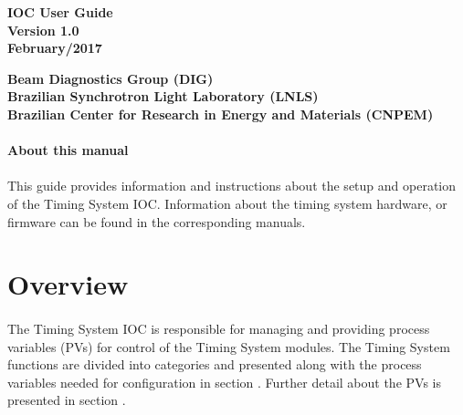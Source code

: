 \documentclass[openany]{article}
\begin{document}
\begin{titlepage}

\thispagestyle{fancy}

\begin{center}

\vspace*{\fill}
\textbf{\Huge IOC User Guide}\\[20pt]
\textbf{\Huge Version 1.0}\\[20pt]
\textbf{\Huge February/2017}
\vspace*{\fill}

\vfill
\textbf{Beam Diagnostics Group (DIG)}\\[5pt]
\textbf{Brazilian Synchrotron Light Laboratory (LNLS)}\\[5pt]
\textbf{Brazilian Center for Research in Energy and Materials (CNPEM)}
\end{center}

\end{titlepage}

\newpage
\pagestyle{plain} %

\paragraph{}{\Large\bfseries About this manual}

\paragraph{} This guide provides information and instructions about the setup and operation of the Timing System IOC. Information about the timing system hardware, or firmware can be found in the corresponding manuals.

\tableofcontents

\newpage
\section{Overview}

	\paragraph{} The Timing System IOC is responsible for managing and providing process variables (PVs) for control of the Timing System modules. The Timing System functions are divided into categories and presented along with the process variables needed for configuration in section . Further detail about the PVs is presented in section .
\end{document}
